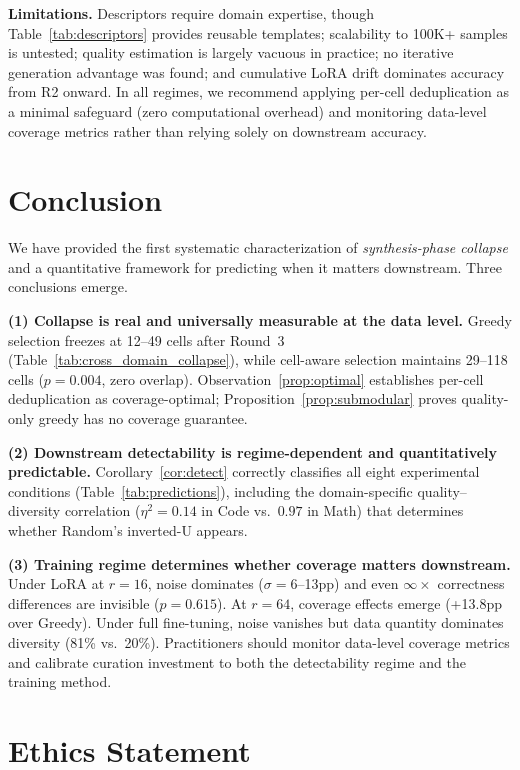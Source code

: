\documentclass{article}
\theoremstyle{plain}
\theoremstyle{remark}
\begin{document}
\textbf{Limitations.}
Descriptors require domain expertise, though Table~\ref{tab:descriptors} provides reusable templates; scalability to 100K+ samples is untested; quality estimation is largely vacuous in practice; no iterative generation advantage was found; and cumulative LoRA drift dominates accuracy from R2 onward.
In all regimes, we recommend applying per-cell deduplication as a minimal safeguard (zero computational overhead) and monitoring data-level coverage metrics rather than relying solely on downstream accuracy.


\section{Conclusion}
\label{sec:conclusion}
We have provided the first systematic characterization of \emph{synthesis-phase collapse} and a quantitative framework for predicting when it matters downstream.
Three conclusions emerge.

\textbf{(1) Collapse is real and universally measurable at the data level.}
Greedy selection freezes at 12--49 cells after Round~3 (Table~\ref{tab:cross_domain_collapse}), while cell-aware selection maintains 29--118 cells ($p{=}0.004$, zero overlap).
Observation~\ref{prop:optimal} establishes per-cell deduplication as coverage-optimal; Proposition~\ref{prop:submodular} proves quality-only greedy has no coverage guarantee.

\textbf{(2) Downstream detectability is regime-dependent and quantitatively predictable.}
Corollary~\ref{cor:detect} correctly classifies all eight experimental conditions (Table~\ref{tab:predictions}), including the domain-specific quality--diversity correlation ($\eta^2{=}0.14$ in Code vs.\ $0.97$ in Math) that determines whether Random's inverted-U appears.

\textbf{(3) Training regime determines whether coverage matters downstream.}
Under LoRA at $r{=}16$, noise dominates ($\sigma{=}6$--13pp) and even $\infty\times$ correctness differences are invisible ($p{=}0.615$).
At $r{=}64$, coverage effects emerge (+13.8pp over Greedy).
Under full fine-tuning, noise vanishes but data quantity dominates diversity (81\% vs.\ 20\%).
Practitioners should monitor data-level coverage metrics and calibrate curation investment to both the detectability regime and the training method.

\section*{Ethics Statement}
\end{document}
